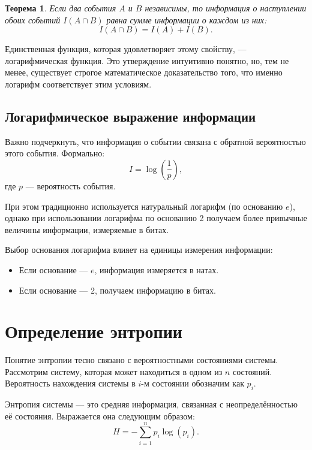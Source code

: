 \documentclass[12pt,a4paper]{article}
\newtheorem{theorem}{Теорема}[section]
\newenvironment{thmbox}[1][]{%
  \begin{tcolorbox}[enhanced, breakable, colback=thmcolor, colframe=blue!50!black, title=#1, fonttitle=\bfseries, arc=3pt, boxrule=0.5pt]
}{\end{tcolorbox}}
\newenvironment{defbox}[1][]{%
  \begin{tcolorbox}[enhanced, breakable, colback=defcolor, colframe=green!50!black, title=#1, fonttitle=\bfseries, arc=3pt, boxrule=0.5pt]
}{\end{tcolorbox}}
\newenvironment{rembox}[1][]{%
  \begin{tcolorbox}[enhanced, breakable, colback=gray!5, colframe=gray!50, title=#1, fonttitle=\bfseries, arc=3pt, boxrule=0.5pt]
}{\end{tcolorbox}}
\begin{document}
\begin{thmbox}[Свойства информации]
\begin{theorem}
Если два события $A$ и $B$ независимы, то информация о наступлении обоих событий $I(A \cap B)$ равна сумме информации о каждом из них: 
\[
I(A \cap B) = I(A) + I(B).
\]
\end{theorem}
\end{thmbox}

Единственная функция, которая удовлетворяет этому свойству, — логарифмическая функция. Это утверждение интуитивно понятно, но, тем не менее, существует строгое математическое доказательство того, что именно логарифм соответствует этим условиям. 

\subsection{Логарифмическое выражение информации}

Важно подчеркнуть, что информация о событии связана с обратной вероятностью этого события. Формально:
\[
I = \log\left(\frac{1}{p}\right),
\]
где $p$ — вероятность события.

При этом традиционно используется натуральный логарифм (по основанию $e$), однако при использовании логарифма по основанию 2 получаем более привычные величины информации, измеряемые в битах.

\begin{rembox}[Основание логарифма]
Выбор основания логарифма влияет на единицы измерения информации:
\begin{itemize}
    \item Если основание — $e$, информация измеряется в натах.
    \item Если основание — 2, получаем информацию в битах.
\end{itemize}
\end{rembox}

\section{Определение энтропии}

Понятие энтропии тесно связано с вероятностными состояниями системы. Рассмотрим систему, которая может находиться в одном из $n$ состояний. Вероятность нахождения системы в $i$-м состоянии обозначим как $p_i$.

\begin{defbox}[Энтропия системы]
Энтропия системы — это средняя информация, связанная с неопределённостью её состояния. Выражается она следующим образом:
\[
H = -\sum_{i=1}^{n} p_i \log(p_i).
\]
\end{defbox}
\end{document}
